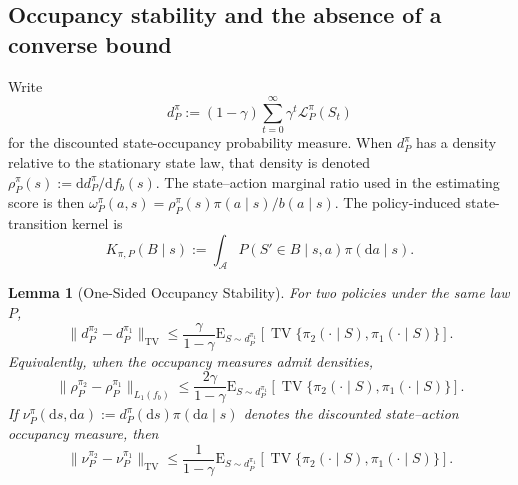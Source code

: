 \documentclass[12pt]{article}
\newtheorem{lemma}[theorem]{Lemma}
\theoremstyle{remark}\newtheorem{remark}[theorem]{Remark}\theoremstyle{plain}
\newcommand{\E}{\mathrm{E}}
\begin{document}
\subsection{Occupancy stability and the absence of a converse bound}

Write
\[
    d_P^\pi := (1-\gamma)\sum_{t=0}^{\infty}\gamma^t
    \mathcal{L}_P^\pi(S_t)
\]
for the discounted state-occupancy probability measure.  When
$d_P^\pi$ has a density relative to the stationary state law, that
density is denoted
$\rho_P^\pi(s):=\mathrm d d_P^\pi/\mathrm d f_b(s)$.  The
state--action marginal ratio used in the estimating score is then
$\omega_P^\pi(a,s)
=\rho_P^\pi(s)\pi(a\mid s)/b(a\mid s)$.
The policy-induced state-transition kernel is
\begin{equation}\label{eq:transition_kernel}
    K_{\pi,P}(B\mid s)
    :=\int_{\mathcal A}P(S'\in B\mid s,a)\pi(\mathrm da\mid s).
\end{equation}

\begin{lemma}[One-Sided Occupancy Stability]
\label{lem:diff_polcies_upper}
    For two policies under the same law $P$,
    \[
        \|d_P^{\pi_2}-d_P^{\pi_1}\|_{\mathrm{TV}}
        \leq
        \frac{\gamma}{1-\gamma}
        \E_{S\sim d_P^{\pi_1}}
        \!\left[\operatorname{TV}
        \{\pi_2(\cdot\mid S),\pi_1(\cdot\mid S)\}\right].
    \]
    Equivalently, when the occupancy measures admit densities,
    \[
        \|\rho_P^{\pi_2}-\rho_P^{\pi_1}\|_{L_1(f_b)}
        \leq
        \frac{2\gamma}{1-\gamma}
        \E_{S\sim d_P^{\pi_1}}
        \!\left[\operatorname{TV}
        \{\pi_2(\cdot\mid S),\pi_1(\cdot\mid S)\}\right].
    \]
    If $\nu_P^\pi(\mathrm ds,\mathrm da)
    :=d_P^\pi(\mathrm ds)\pi(\mathrm da\mid s)$ denotes the discounted
    state--action occupancy measure, then
    \[
        \|\nu_P^{\pi_2}-\nu_P^{\pi_1}\|_{\mathrm{TV}}
        \leq
        \frac{1}{1-\gamma}
        \E_{S\sim d_P^{\pi_1}}
        \!\left[\operatorname{TV}
        \{\pi_2(\cdot\mid S),\pi_1(\cdot\mid S)\}\right].
    \]
\end{lemma}
\end{document}
